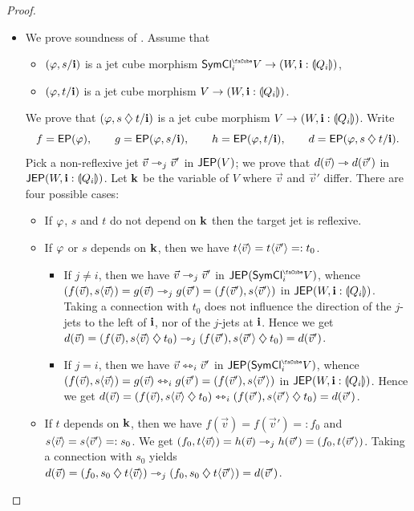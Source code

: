 \documentclass[a4paper]{memoir}
\begin{document}
\begin{proof}
\begin{itemize}
		\item We prove soundness of .
		Assume that
		\begin{itemize}
			\item $(\varphi, s / \mathbf{i})$ is a jet cube morphism $\UFsymcube_i V \to (W, \dm i : \rival{Q_i})$,
			\item $(\varphi, t / \mathbf{i})$ is a jet cube morphism $V \to (W, \mathbf{i} : {\llparenthesis Q_i \rrparenthesis})$.
		\end{itemize}
		We prove that $(\varphi, s \mathbin{\diamondsuit} t / \mathbf{i})$ is a jet cube morphism $V \to (W, \mathbf{i} : {\llparenthesis Q_i \rrparenthesis})$.
		Write
		\[
			f = \mathsf{EP}(\varphi), \qquad
			g = \mathsf{EP}(\varphi, s / \mathbf{i}), \qquad
			h = \mathsf{EP}(\varphi, t / \mathbf{i}), \qquad
			d = \mathsf{EP}(\varphi, s \mathbin{\diamondsuit} t / \mathbf{i}).
		\]
		Pick a non-reflexive jet $\vec v \rightarrowtriangle_j \vec v'$ in $\mathsf{JEP}(V)$; we prove that $d(\vec v) \rightarrowtriangle d(\vec v')$ in $\mathsf{JEP}(W, \mathbf{i} : {\llparenthesis Q_i \rrparenthesis})$.
		Let $\mathbf{k}$ be the variable of $V$ where $\vec v$ and $\vec v'$ differ.
		There are four possible cases:
		\begin{itemize}
			\item If $\varphi$, $s$ and $t$ do not depend on $\mathbf{k}$ then the target jet is reflexive.
			\item If $\varphi$ or $s$ depends on $\mathbf{k}$, then we have $t \langle \vec v \rangle = t \langle \vec v' \rangle =: t_0$.
			\begin{itemize}
				\item If $j \neq i$, then we have $\vec v \rightarrowtriangle_j \vec v'$ in $\JEP(\UFsymcube_i V)$, whence $(f(\vec v), s\langle \vec v \rangle) = g(\vec v) \rightarrowtriangle_j g(\vec v') = (f(\vec v'), s\langle \vec v' \rangle)$ in $\mathsf{JEP}(W, \mathbf{i} : {\llparenthesis Q_i \rrparenthesis})$.
				Taking a connection with $t_0$ does not influence the direction of the $j$-jets to the left of $\mathbf{i}$, nor of the $j$-jets at $\mathbf{i}$.
				Hence we get $d(\vec v) = (f(\vec v), s\langle \vec v \rangle \mathbin{\diamondsuit} t_0) \rightarrowtriangle_j (f(\vec v'), s\langle \vec v' \rangle \mathbin{\diamondsuit} t_0) = d(\vec v')$.
				
				\item If $j = i$, then we have $\vec v \leftrightarrowtriangle_i \vec v'$ in $\JEP(\UFsymcube_i V)$, whence $(f(\vec v), s\langle \vec v \rangle) = g(\vec v) \leftrightarrowtriangle_i g(\vec v') = (f(\vec v'), s\langle \vec v' \rangle)$ in $\mathsf{JEP}(W, \mathbf{i} : {\llparenthesis Q_i \rrparenthesis})$.
				Hence we get $d(\vec v) = (f(\vec v), s\langle \vec v \rangle \mathbin{\diamondsuit} t_0) \leftrightarrowtriangle_i (f(\vec v'), s\langle \vec v' \rangle \mathbin{\diamondsuit} t_0) = d(\vec v')$.
			\end{itemize}
			\item If $t$ depends on $\mathbf{k}$, then we have $f(\vec v) = f(\vec v') = : f_0$ and $s \langle \vec v \rangle = s \langle \vec v' \rangle =: s_0$.
			We get $(f_0, t \langle \vec v \rangle) = h(\vec v) \rightarrowtriangle_j h(\vec v') = (f_0, t \langle \vec v' \rangle)$.
			Taking a connection with $s_0$ yields $d(\vec v) = (f_0, s_0 \mathbin{\diamondsuit} t \langle \vec v \rangle) \rightarrowtriangle_j (f_0, s_0 \mathbin{\diamondsuit} t \langle \vec v' \rangle) = d(\vec v')$. \qedhere
		\end{itemize}
		

\end{itemize}
\end{proof}
\end{document}
